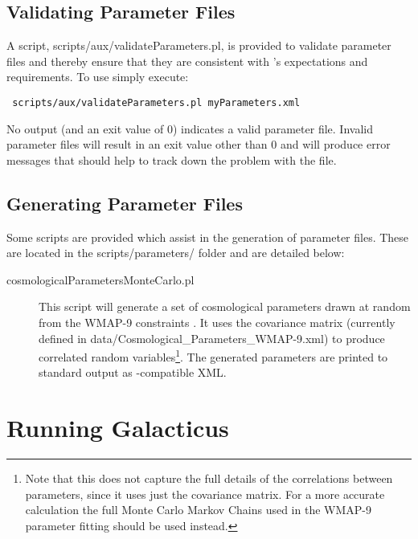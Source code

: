 \subsection{Validating Parameter Files}

A script, {\normalfont \ttfamily scripts/aux/validateParameters.pl}, is provided to validate parameter files and thereby ensure that they are consistent with \glc's expectations and requirements. To use simply execute:
\begin{verbatim}
 scripts/aux/validateParameters.pl myParameters.xml
\end{verbatim}
No output (and an exit value of 0) indicates a valid parameter file. Invalid parameter files will result in an exit value other than 0 and will produce error messages that should help to track down the problem with the file.

\subsection{Generating Parameter Files}

Some scripts are provided which assist in the generation of parameter files. These are located in the {\normalfont \ttfamily scripts/parameters/} folder and are detailed below:
\begin{description}
\item [{\normalfont \ttfamily cosmologicalParametersMonteCarlo.pl}] This script will generate a set of cosmological parameters drawn at random from the WMAP-9 constraints \cite{hinshaw_nine-year_2012}. It uses the covariance matrix (currently defined in {\normalfont \ttfamily data/Cosmological\_Parameters\_WMAP-9.xml}) to produce correlated random variables\footnote{Note that this does not capture the full details of the correlations between parameters, since it uses just the covariance matrix. For a more accurate calculation the full Monte Carlo Markov Chains used in the WMAP-9 parameter fitting should be used instead.}. The generated parameters are printed to standard output as \glc-compatible XML.
\end{description}

\section{Running Galacticus}

